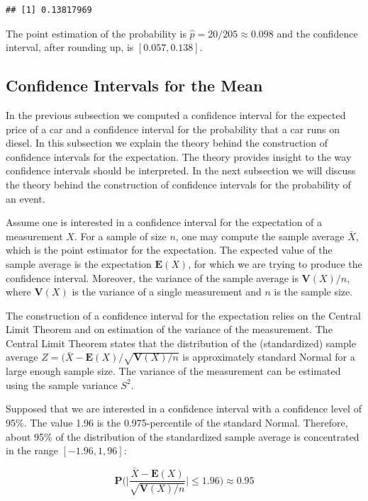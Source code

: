 \documentclass[]{krantz}
\newcommand{\Expec}{\mathbf{E}}
\newcommand{\Prob}{\mathbf{P}}
\newcommand{\Var}{\mathbf{V}}
\theoremstyle{definition}
\theoremstyle{definition}
\theoremstyle{definition}
\theoremstyle{remark}
\begin{document}
\begin{verbatim}
## [1] 0.13817969
\end{verbatim}

The point estimation of the probability is
\(\hat p = 20/205 \approx 0.098\) and the confidence interval, after
rounding up, is \([0.057, 0.138]\).

\hypertarget{subsec:CImean}{%
\subsection{Confidence Intervals for the Mean}\label{subsec:CImean}}

In the previous subsection we computed a confidence interval for the
expected price of a car and a confidence interval for the probability
that a car runs on diesel. In this subsection we explain the theory
behind the construction of confidence intervals for the expectation. The
theory provides insight to the way confidence intervals should be
interpreted. In the next subsection we will discuss the theory behind
the construction of confidence intervals for the probability of an
event.

Assume one is interested in a confidence interval for the expectation of
a measurement \(X\). For a sample of size \(n\), one may compute the sample
average \(\bar X\), which is the point estimator for the expectation. The
expected value of the sample average is the expectation \(\Expec(X)\), for
which we are trying to produce the confidence interval. Moreover, the
variance of the sample average is \(\Var(X)/n\), where \(\Var(X)\) is the
variance of a single measurement and \(n\) is the sample size.

The construction of a confidence interval for the expectation relies on
the Central Limit Theorem and on estimation of the variance of the
measurement. The Central Limit Theorem states that the distribution of
the (standardized) sample average \(Z = (\bar X - \Expec(X)/\sqrt{\Var(X)/n}\)
is approximately standard Normal for a large enough sample size. The variance of the measurement can be estimated using the sample variance \(S^2\).

Supposed that we are interested in a confidence interval with a
confidence level of 95\%. The value 1.96 is the 0.975-percentile of the
standard Normal. Therefore, about 95\% of the distribution of the
standardized sample average is concentrated in the range \([-1.96,1,96]\):

\[\Prob \bigg(\bigg|\frac{\bar X - \Expec(X)}{\sqrt{\Var(X)/n}}\bigg| \leq 1.96 \bigg) \approx 0.95\]
\end{document}
